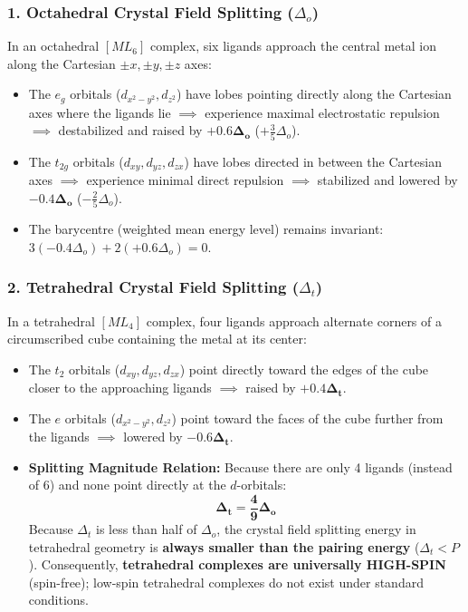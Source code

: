 \documentclass[10pt,twoside,openright]{book}
\begin{document}
\subsubsection{1. Octahedral Crystal Field Splitting ($\Delta_o$)}
In an octahedral $[ML_6]$ complex, six ligands approach the central metal ion along the Cartesian $\pm x, \pm y, \pm z$ axes:
\begin{itemize}
  \item The $e_g$ orbitals ($d_{x^2-y^2}, d_{z^2}$) have lobes pointing directly along the Cartesian axes where the ligands lie $\implies$ experience maximal electrostatic repulsion $\implies$ destabilized and raised by $\mathbf{+0.6\Delta_o}$ ($+\frac{3}{5}\Delta_o$).
  \item The $t_{2g}$ orbitals ($d_{xy}, d_{yz}, d_{zx}$) have lobes directed in between the Cartesian axes $\implies$ experience minimal direct repulsion $\implies$ stabilized and lowered by $\mathbf{-0.4\Delta_o}$ ($-\frac{2}{5}\Delta_o$).
  \item The barycentre (weighted mean energy level) remains invariant: $3(-0.4\Delta_o) + 2(+0.6\Delta_o) = 0$.
\end{itemize}

\subsubsection{2. Tetrahedral Crystal Field Splitting ($\Delta_t$)}
In a tetrahedral $[ML_4]$ complex, four ligands approach alternate corners of a circumscribed cube containing the metal at its center:
\begin{itemize}
  \item The $t_2$ orbitals ($d_{xy}, d_{yz}, d_{zx}$) point directly toward the edges of the cube closer to the approaching ligands $\implies$ raised by $\mathbf{+0.4\Delta_t}$.
  \item The $e$ orbitals ($d_{x^2-y^2}, d_{z^2}$) point toward the faces of the cube further from the ligands $\implies$ lowered by $\mathbf{-0.6\Delta_t}$.
  \item \textbf{Splitting Magnitude Relation:} Because there are only 4 ligands (instead of 6) and none point directly at the $d$-orbitals:
  \begin{equation}
    \mathbf{\Delta_t = \frac{4}{9}\Delta_o}
  \end{equation}
  Because $\Delta_t$ is less than half of $\Delta_o$, the crystal field splitting energy in tetrahedral geometry is \textbf{always smaller than the pairing energy} ($\Delta_t < P$). Consequently, \textbf{tetrahedral complexes are universally HIGH-SPIN} (spin-free); low-spin tetrahedral complexes do not exist under standard conditions.
\end{itemize}
\end{document}
